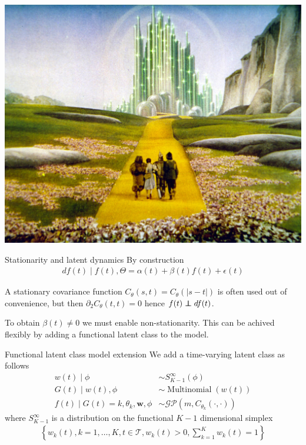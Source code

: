 \documentclass[ignorenonframetext,xcolor=pdflatex,table,dvipsnames,serif]{beamer}
\DeclareMathOperator{\Multinomial}{Multinomial}
\newcommand\independent{\protect\mathpalette{\protect\independenT}{\perp}}
\def\independenT#1#2{\mathrel{\rlap{$#1#2$}\mkern2mu{#1#2}}}
\begin{document}
\begin{frame}
\center\includegraphics[scale=0.1175]{ybr.jpeg}
\end{frame}

\begin{frame}{Stationarity and latent dynamics}
By construction
\begin{align*}
  df(t) \mid f(t), \Theta = \alpha(t) + \beta(t)f(t) + \epsilon(t)
\end{align*}

\pause

\vspace{0.8cm}

A stationary covariance function $C_\theta(s,t) = C_\theta(|s-t|)$ is often used out of convenience, but then $\partial_2 C_\theta(t,t) = 0$ hence $f(t) \independent df(t)$.

\vspace{0.8cm}

\pause

To obtain $\beta(t) \ne 0$ we must enable non-stationarity. This can be achived flexibly by adding a functional latent class to the model.
\end{frame}

\begin{frame}{Functional latent class model extension}
We add a time-varying latent class as follows
\begin{align*}
  w(t) \mid \phi &\sim S_{K-1}^\infty(\phi)\\
  G(t) \mid w(t), \phi &\sim \Multinomial(w(t))\\
  f(t) \mid G(t) = k, \theta_k, \mathbf{w}, \phi &\sim \mathcal{GP}(m, C_{\theta_k}(\cdot,\cdot))
\end{align*}
where $S_{K-1}^\infty$ is a distribution on the functional $K-1$ dimensional simplex
\begin{align*}
  \left\{w_k(t), k = 1,\ldots, K, t \in \mathcal{T}, w_k(t) > 0, \sum_{k=1}^K w_k(t) = 1\right\}
\end{align*}
\end{frame}
\end{document}
